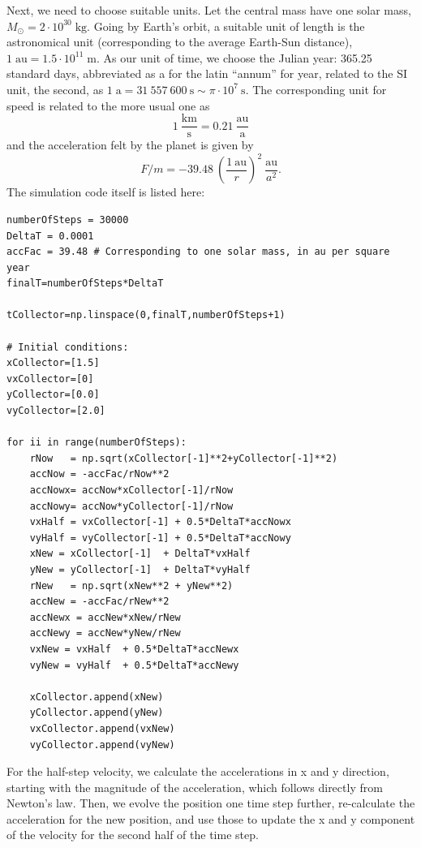 \documentclass[twocolumn,apj]{openjournal}
\newcommand{\be}{\begin{equation}}
\newcommand{\ee}{\end{equation}}
\begin{document}
Next, we need to choose suitable units. Let the central mass have one solar mass, $M_{\odot} = 2\cdot 10^{30}\;\mbox{kg}$. Going by Earth's orbit, a suitable unit of length is the astronomical unit (corresponding to the average Earth-Sun distance), $1\;\mbox{au} = 1.5\cdot 10^{11}\;\mbox{m}$. As our unit of time, we choose the Julian year: 365.25 standard days, abbreviated as a for the latin ``annum'' for year, related to the SI unit, the second, as $1\;\mbox{a} = 31~557~600\:\mbox{s}\sim\pi\cdot 10^7\:\mbox{s}$. The corresponding unit for speed is related to the more usual one as 
\be
1\:\frac{\mbox{km}}{\mbox{s}} = 0.21\:\frac{\mbox{au}}{\mbox{a}}
\ee
and the acceleration felt by the planet is given by
\be
F/m = -39.48\:\left(\frac{1\:\mbox{au}}{r}\right)^2\:\frac{\mbox{au}}{a^2}.
\label{FmFormulaAU}
\ee
The simulation code itself is listed here:
\begin{lstlisting}
numberOfSteps = 30000
DeltaT = 0.0001
accFac = 39.48 # Corresponding to one solar mass, in au per square year
finalT=numberOfSteps*DeltaT

tCollector=np.linspace(0,finalT,numberOfSteps+1)

# Initial conditions:
xCollector=[1.5]
vxCollector=[0]
yCollector=[0.0]
vyCollector=[2.0]

for ii in range(numberOfSteps):
    rNow   = np.sqrt(xCollector[-1]**2+yCollector[-1]**2)
    accNow = -accFac/rNow**2
    accNowx= accNow*xCollector[-1]/rNow
    accNowy= accNow*yCollector[-1]/rNow
    vxHalf = vxCollector[-1] + 0.5*DeltaT*accNowx
    vyHalf = vyCollector[-1] + 0.5*DeltaT*accNowy
    xNew = xCollector[-1]  + DeltaT*vxHalf
    yNew = yCollector[-1]  + DeltaT*vyHalf
    rNew   = np.sqrt(xNew**2 + yNew**2)
    accNew = -accFac/rNew**2
    accNewx = accNew*xNew/rNew
    accNewy = accNew*yNew/rNew
    vxNew = vxHalf  + 0.5*DeltaT*accNewx
    vyNew = vyHalf  + 0.5*DeltaT*accNewy
      
    xCollector.append(xNew)
    yCollector.append(yNew)
    vxCollector.append(vxNew)    
    vyCollector.append(vyNew)
\end{lstlisting}
For the half-step velocity, we calculate the accelerations in x and y direction, starting with the magnitude of the acceleration, which follows directly from Newton's law. Then, we evolve the position one time step further, re-calculate the acceleration for the new position, and use those to update the x and y component of the velocity for the second half of the time step. 
\end{document}
